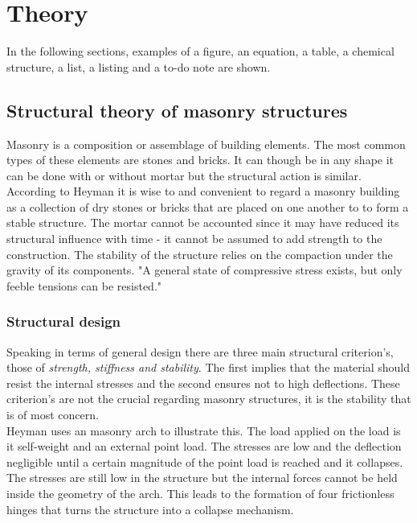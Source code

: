 \chapter{Theory}

In the following sections, examples of a figure, an equation, a table, a chemical structure, a list, a listing and a to-do note are shown.

\section{Structural theory of masonry structures}

Masonry is a composition or assemblage of building elements. The most common types of these elements are stones and bricks. It can though be in any shape it can be done with or without mortar but the structural action is similar. According to Heyman \cite{ref:Heyman} it is wise to and convenient to regard a masonry building as a collection of dry stones or bricks that are placed on one another to to form a stable structure. The mortar cannot be accounted since it may have reduced its structural influence with time - it cannot be assumed to add strength to the construction. The stability of the structure relies on the compaction under the gravity of its components. "A general state of compressive stress exists, but only feeble tensions can be resisted."\\

\subsection{Structural design}
Speaking in terms of general design there are three main structural criterion's, those of \textit{strength, stiffness and stability}. The first implies that the material should resist the internal stresses and the second ensures not to high deflections. These criterion's are not the crucial regarding masonry structures, it is the stability that is of most concern.\\

Heyman uses an masonry arch to illustrate this. The load applied on the load is it self-weight and an external point load. The stresses are low and the deflection negligible until a certain magnitude of the point load is reached and it collapses. The stresses are still low in the structure but the internal forces cannot be held inside the geometry of the arch. This leads to the formation of four frictionless hinges that turns the structure into a collapse mechanism.\\   

